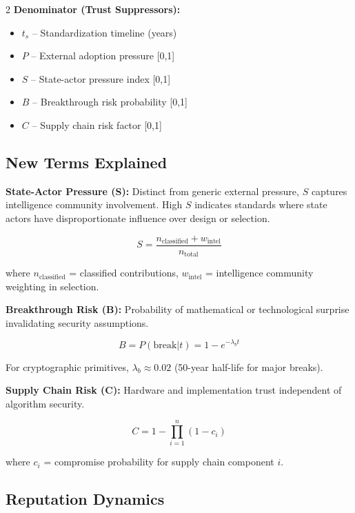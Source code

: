 \documentclass[11pt]{article}
\begin{document}
\begin{multicols}{2}
\textbf{Denominator (Trust Suppressors):}
\begin{itemize}[noitemsep]
\item $t_s$ -- Standardization timeline (years)
\item $P$ -- External adoption pressure [0,1]
\item $S$ -- State-actor pressure index [0,1]
\item $B$ -- Breakthrough risk probability [0,1]
\item $C$ -- Supply chain risk factor [0,1]
\end{itemize}

\subsection{New Terms Explained}

\textbf{State-Actor Pressure (S):} Distinct from generic external pressure, $S$ captures intelligence community involvement. High $S$ indicates standards where state actors have disproportionate influence over design or selection.

\begin{equation}
S = \frac{n_{\text{classified}} + w_{\text{intel}}}{n_{\text{total}}}
\end{equation}

where $n_{\text{classified}}$ = classified contributions, $w_{\text{intel}}$ = intelligence community weighting in selection.

\textbf{Breakthrough Risk (B):} Probability of mathematical or technological surprise invalidating security assumptions.

\begin{equation}
B = P(\text{break}|t) = 1 - e^{-\lambda_b t}
\end{equation}

For cryptographic primitives, $\lambda_b \approx 0.02$ (50-year half-life for major breaks).

\textbf{Supply Chain Risk (C):} Hardware and implementation trust independent of algorithm security.

\begin{equation}
C = 1 - \prod_{i=1}^{n}(1 - c_i)
\end{equation}

where $c_i$ = compromise probability for supply chain component $i$.

\subsection{Reputation Dynamics}


\end{multicols}
\end{document}
